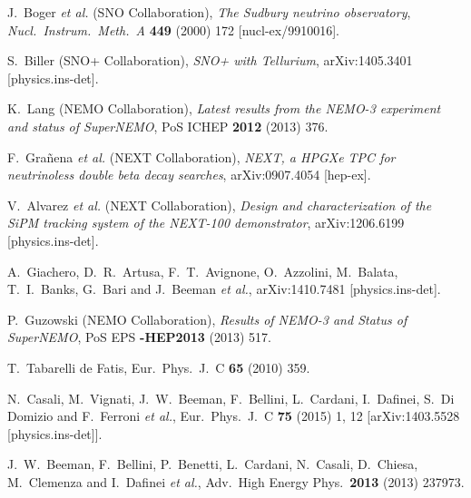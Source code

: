 \documentclass{PoS}
\begin{document}
\begin{thebibliography}{99}
   J.~Boger {\it et al.} (SNO Collaboration),
   \emph{The Sudbury neutrino observatory},
   \emph{Nucl.\ Instrum.\ Meth.\ A} {\bf 449} (2000) 172
   [nucl-ex/9910016].

   S.~Biller (SNO+ Collaboration),
   \emph{SNO+ with Tellurium},
   arXiv:1405.3401 [physics.ins-det].

   K.~Lang (NEMO Collaboration),
   \emph{Latest results from the NEMO-3 experiment and status of SuperNEMO},
   PoS ICHEP {\bf 2012} (2013) 376.


   F.~Gra\~nena {\it et al.} (NEXT Collaboration),
   \emph{NEXT, a HPGXe TPC for neutrinoless double beta decay searches},
   arXiv:0907.4054 [hep-ex].

  V.~Alvarez {\it et al.} (NEXT Collaboration),
   \emph{Design and characterization of the SiPM tracking system of the NEXT-100 demonstrator},
   arXiv:1206.6199 [physics.ins-det].

  A.~Giachero, D.~R.~Artusa, F.~T.~Avignone, O.~Azzolini, M.~Balata, T.~I.~Banks, G.~Bari and J.~Beeman {\it et al.},
  arXiv:1410.7481 [physics.ins-det].

   P.~Guzowski (NEMO Collaboration),
   \emph{Results of NEMO-3 and Status of SuperNEMO},
   PoS EPS {\bf -HEP2013} (2013) 517.

  T.~Tabarelli de Fatis,
  Eur.\ Phys.\ J.\ C {\bf 65} (2010) 359.

  N.~Casali, M.~Vignati, J.~W.~Beeman, F.~Bellini, L.~Cardani, I.~Dafinei, S.~Di Domizio and F.~Ferroni {\it et al.},
  Eur.\ Phys.\ J.\ C {\bf 75} (2015) 1,  12
  [arXiv:1403.5528 [physics.ins-det]].

  J.~W.~Beeman, F.~Bellini, P.~Benetti, L.~Cardani, N.~Casali, D.~Chiesa, M.~Clemenza and I.~Dafinei {\it et al.},
  Adv.\ High Energy Phys.\  {\bf 2013} (2013) 237973.


\end{thebibliography}
\end{document}
